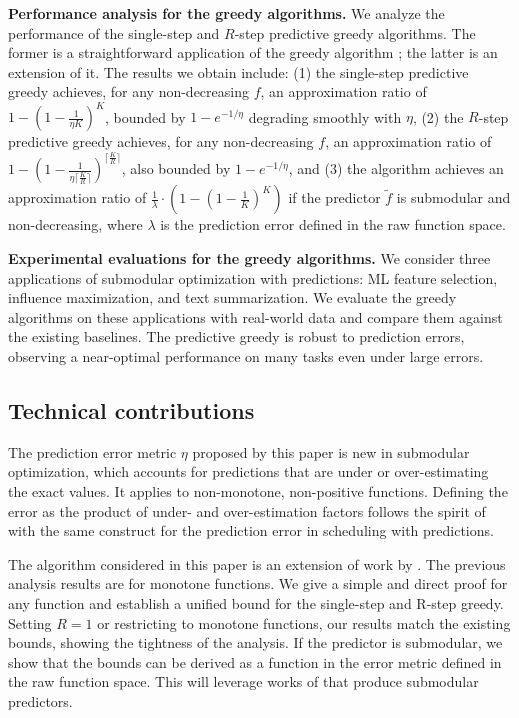 \noindent \textbf{Performance analysis for the greedy algorithms.}
We analyze the performance of the single-step and $R$-step predictive greedy algorithms. The former is a straightforward application of the greedy algorithm \cite{greedySubmodularFunctions}; the latter is an extension of it. The results we obtain include: (1) the single-step predictive greedy achieves, for any non-decreasing $f$, an approximation ratio of $1 - (1 - \frac{1}{\eta K})^K$, bounded by $1 - e^{-1/{\eta}}$ degrading smoothly with $\eta$, (2) the $R$-step predictive greedy achieves, for any non-decreasing $f$, an approximation ratio of $1 - (1 - \frac{1}{\eta {\lceil \frac{K}{R} \rceil}})^{\lceil \frac{K}{R} \rceil}$, also bounded by $1 - e^{-1/{\eta}}$, and (3) the algorithm achieves an approximation ratio of $\frac{1}{\lambda} \cdot (1 - (1 - \frac{1}{K})^K)$ if the predictor $\tilde{f}$ is submodular and non-decreasing, where $\lambda$ is the prediction error defined in the raw function space. 


\noindent \textbf{Experimental evaluations for the greedy algorithms.}
We consider three applications of submodular optimization with predictions: ML feature selection, influence maximization, and text summarization. We evaluate the greedy algorithms on these applications with real-world data and compare them against the existing baselines. The predictive greedy is robust to prediction errors, observing a near-optimal performance on many tasks even under large errors. 


 

\subsection{Technical contributions}

The prediction error metric $\eta$ proposed by this paper is new in submodular optimization, which accounts for predictions that are under or over-estimating the exact values. It applies to non-monotone, non-positive functions. Defining the error as the product of under- and over-estimation factors follows the spirit of \cite{FlowTimeScheduling} with the same construct for the prediction error in scheduling with predictions.

The algorithm considered in this paper is an extension of work by \cite{greedySubmodularFunctions}. The previous analysis results are for monotone functions. We give a simple and direct proof for any function and establish a unified bound for the single-step and R-step greedy. Setting $R = 1$ or restricting to monotone functions, our results match the existing bounds, showing the tightness of the analysis. If the predictor is submodular, we show that the bounds can be derived as a function in the error metric defined in the raw function space. This will leverage works of \cite{approxSubmodularFunctions} that produce submodular predictors. 

